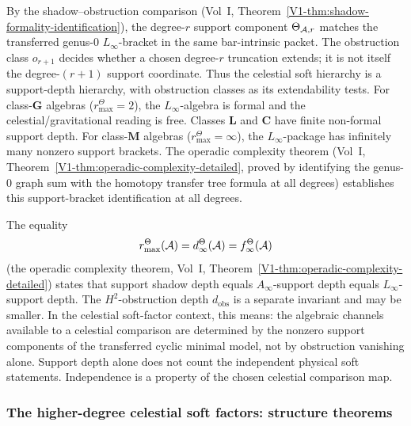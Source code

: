 \begin{remark}
By the shadow--obstruction comparison
(Vol~I, Theorem~\ref*{V1-thm:shadow-formality-identification}),
the degree-\(r\) support component \(\Theta_{\mathcal{A},r}\) matches the
transferred genus-$0$ \(L_\infty\)-bracket in the same
bar-intrinsic packet. The obstruction class \(o_{r+1}\) decides
whether a chosen degree-\(r\) truncation extends; it is not itself
the degree-\((r+1)\) support coordinate. Thus the celestial soft
hierarchy is a support-depth hierarchy, with obstruction classes
as its extendability tests. For class-\(\mathbf{G}\) algebras
(\(r^\Theta_{\max}=2\)), the \(L_\infty\)-algebra is formal and the
celestial/gravitational reading is free. Classes \(\mathbf{L}\) and
\(\mathbf{C}\) have finite non-formal support depth. For
class-\(\mathbf{M}\) algebras (\(r^\Theta_{\max}=\infty\)), the
\(L_\infty\)-package has infinitely many nonzero support brackets.
The operadic complexity theorem (Vol~I,
Theorem~\ref*{V1-thm:operadic-complexity-detailed}, proved by
identifying the genus-$0$ graph sum with the homotopy transfer tree
formula at all degrees) establishes this support-bracket
identification at all degrees.
\end{remark}

\begin{remark}
The equality
\[
r^\Theta_{\max}(\mathcal{A})=d^\Theta_\infty(\mathcal{A})=f^\Theta_\infty(\mathcal{A})
\]
(the operadic complexity theorem, Vol~I,
Theorem~\ref*{V1-thm:operadic-complexity-detailed}) states that
support shadow depth equals \(A_\infty\)-support depth equals
\(L_\infty\)-support depth. The \(H^2\)-obstruction depth
\(d_{\mathrm{obs}}\) is a separate invariant and may be smaller.
In the celestial soft-factor context, this means: the algebraic
channels available to a celestial comparison are determined by the
nonzero support components of the transferred cyclic minimal model,
not by obstruction vanishing alone.  Support depth alone does not
count the independent physical soft statements.  Independence is a
property of the chosen celestial comparison map.
\end{remark}

\subsubsection{The higher-degree celestial soft factors: structure theorems}


